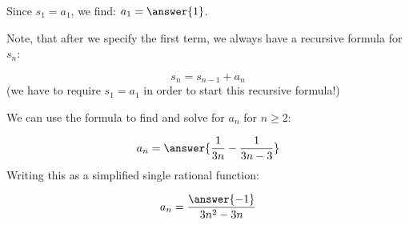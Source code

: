 \documentclass{ximera}
\begin{document}
\begin{exercise}
\begin{hint}
Since $s_1=a_1$, we find: $a_1 = \answer{1}$.

Note, that after we specify the first term, we always have a recursive formula for $s_n$:

\[
s_n = s_{n-1}+a_n
\]
(we have to require $s_1=a_1$ in order to start this recursive formula!)

We can use the formula to find  and solve for $a_n$ for $n \geq 2$:

\[
a_n = \answer{\frac{1}{3n}-\frac{1}{3n-3}}
\]
Writing this as a simplified single rational function:

\[
a_n = \frac{\answer{-1}}{3n^2-3n}
\]

\end{hint}
\end{exercise}
\end{document}
